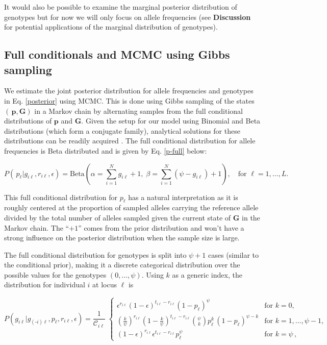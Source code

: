 \documentclass[11pt,english,letterpaper,oneside]{article}
\begin{document}
\noindent It would also be possible to examine the marginal posterior distribution of genotypes but for now we will only focus on allele frequencies (see \textbf{Discussion} for potential applications of the marginal distribution of genotypes).

\medskip
\subsection*{Full conditionals and MCMC using Gibbs sampling}
\medskip

\noindent We estimate the joint posterior distribution for allele frequencies and genotypes in Eq. \ref{posterior} using MCMC. This is done using Gibbs sampling of the states $(\,\bm{p},\bm{G})$ in a Markov chain by alternating samples from the full conditional distributions of $\bm{p}$ and $\bm{G}$. Given the setup for our model using Binomial and Beta distributions (which form a conjugate family), analytical solutions for these distributions can be readily acquired \citep{gelman2014bayesian}. The full conditional distribution for allele frequencies is Beta distributed and is given by Eq. \ref{p-full} below:

\begin{equation}\label{p-full}
P(\,p_{\ell}|g_{i \ell},r_{i \ell},\epsilon) = \text{Beta}\left(\alpha= \sum_{i=1}^N g_{i \ell} +1,\; \beta = \sum_{i=1}^N (\psi-g_{i \ell})+1\right),\quad \text{for } \ell = 1,\ldots,L.
\end{equation}

\noindent This full conditional distribution for $p_{\ell}$ has a natural interpretation as it is roughly centered at the proportion of sampled alleles carrying the reference allele divided by the total number of alleles sampled given the current state of $\bm{G}$ in the Markov chain. The ``$+1$'' comes from the prior distribution and won't have a strong influence on the posterior distribution when the sample size is large.
\medskip

The full conditional distribution for genotypes is split into $\psi+1$ cases (similar to the conditional prior), making it a discrete categorical distribution over the possible values for the genotypes $(0,\ldots,\psi)$. Using $k$ as a generic index, the distribution for individual $i$ at locus $\ell$ is

\begin{equation}\label{G-full}
P(g_{i \ell}|g_{(\text{-}i) \ell},p_{\ell},r_{i \ell},\epsilon) = \frac{1}{\mathcal{C}_{i \ell}} \;
	\begin{cases}
	\epsilon^{r_{i \ell}}(1-\epsilon)^{t_{i \ell}-r_{i \ell}}(1-p_{\ell})^\psi & \text{for  } k = 0, \\[0.05in]
	\left(\frac{k}{\psi}\right)^{r_{i \ell}}\left(1-\frac{k}{\psi}\right)^{t_{i \ell}-r_{i \ell}}\displaystyle\binom{\psi}{k}p_{\ell}^{k}\,(1-p_{\ell})^{\psi-k} & \text{for  } k = 1,\ldots,\psi-1, \\[0.05in]
	(1-\epsilon)^{r_{i \ell}}\epsilon^{t_{i \ell}-r_{i \ell}}p_{\ell}^\psi & \text{for  } k = \psi\,,
	\end{cases} 
\end{equation}
\end{document}
